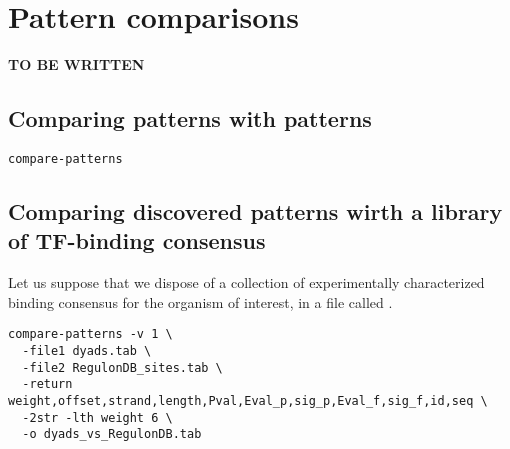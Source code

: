 \section{Pattern comparisons}

\textbf{TO BE WRITTEN}

\subsection{Comparing patterns with patterns}

\begin{small}
\begin{verbatim}
compare-patterns

\end{verbatim}
\end{small}

\subsection{Comparing discovered patterns wirth a library of TF-binding consensus}

Let us suppose that we dispose of a collection of experimentally
characterized binding consensus for the organism of interest, in a
file called . 

\begin{small}
\begin{verbatim}
compare-patterns -v 1 \
  -file1 dyads.tab \
  -file2 RegulonDB_sites.tab \
  -return weight,offset,strand,length,Pval,Eval_p,sig_p,Eval_f,sig_f,id,seq \
  -2str -lth weight 6 \
  -o dyads_vs_RegulonDB.tab
\end{verbatim}
\end{small}
